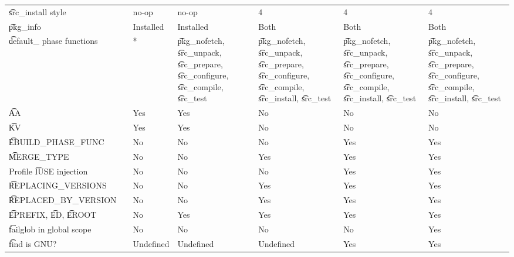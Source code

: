 \begin{landscape}
\begin{longtable}{llP{7.5em}P{7.5em}P{7.5em}P{7.5em}P{7.5em}}
\t{src\_install} style &  &
    no-op & no-op & 4 & 4 & 4 \\

\t{pkg\_info} &  &
    Installed & Installed & Both & Both & Both \\

\t{default\_} phase functions &  &
    * &
    \t{pkg\_nofetch}, \t{src\_unpack}, \t{src\_prepare}, \t{src\_configure},
        \t{src\_compile}, \t{src\_test} &
    \t{pkg\_nofetch}, \t{src\_unpack}, \t{src\_prepare}, \t{src\_configure},
        \t{src\_compile}, \t{src\_install}, \t{src\_test} &
    \t{pkg\_nofetch}, \t{src\_unpack}, \t{src\_prepare}, \t{src\_configure},
        \t{src\_compile}, \t{src\_install}, \t{src\_test} &
    \t{pkg\_nofetch}, \t{src\_unpack}, \t{src\_prepare}, \t{src\_configure},
        \t{src\_compile}, \t{src\_install}, \t{src\_test} \\

\t{AA} &  &
    Yes & Yes & No & No & No \\

\t{KV} &  &
    Yes & Yes & No & No & No \\

\t{EBUILD\_PHASE\_FUNC} &  &
    No & No & No & Yes & Yes \\

\t{MERGE\_TYPE} &  &
    No & No & Yes & Yes & Yes \\

Profile \t{IUSE} injection &  &
    No & No & No & Yes & Yes \\

\t{REPLACING\_VERSIONS} &  &
    No & No & Yes & Yes & Yes \\

\t{REPLACED\_BY\_VERSION} &  &
    No & No & Yes & Yes & Yes \\

\t{EPREFIX}, \t{ED}, \t{EROOT} &  &
    No & Yes & Yes & Yes & Yes \\

\t{failglob} in global scope &  &
    No & No & No & No & Yes \\

\t{find} is GNU? &  &
    Undefined & Undefined & Undefined & Yes & Yes \\


\end{longtable}
\end{landscape}
